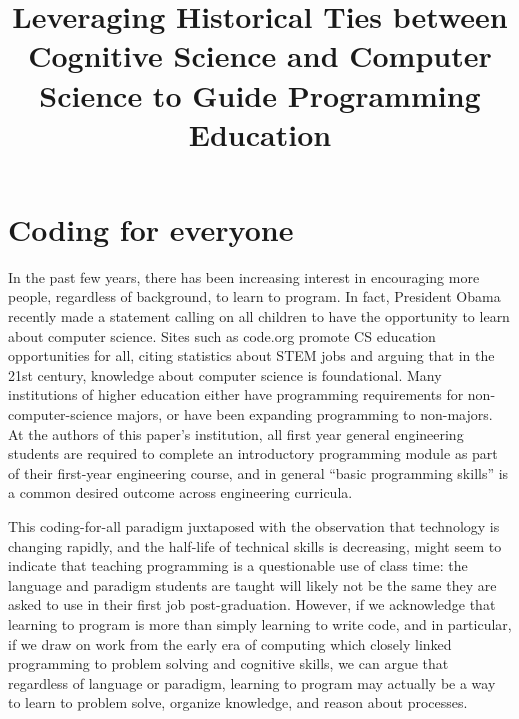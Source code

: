 \documentclass[12pt]{article}
\title{\large \textbf{Leveraging Historical Ties between Cognitive Science and
  Computer Science to Guide Programming Education}}
\author{}
\date{}
\begin{document}
\raggedright
\maketitle
\thispagestyle{empty}
\pagestyle{empty}

\section*{Coding for everyone}
In the past few years, there has been increasing interest in
encouraging more people, regardless of background, to learn to
program. In fact, President Obama recently made a statement calling on
all children to have the opportunity to learn about computer
science\autocite{whitehouse_computer_2016}. Sites such as code.org
promote CS education opportunities for all, citing statistics about
STEM jobs and arguing that in the 21st century, knowledge about
computer science is foundational\autocite{code.org_every_2016}. Many
institutions of higher education either have programming requirements
for non-computer-science majors, or have been expanding programming to
non-majors\autocite{rich_cs1_2004,forte_motivation_2005,guzdial_design_2005}. At
the authors of this paper's institution, all first year general
engineering students are required to complete an introductory
programming module as part of their first-year engineering course, and
in general ``basic programming skills'' is a common desired outcome
across engineering curricula\autocite{reid_classification_2014}.

This coding-for-all paradigm juxtaposed with the observation that
technology is changing rapidly, and the half-life of technical skills
is decreasing\autocite{nae_educating_2004}, might seem to indicate that
teaching programming is a questionable use of class time: the language
and paradigm students are taught will likely not be the same they are
asked to use in their first job post-graduation. However, if we
acknowledge that learning to program is more than simply learning to
write code, and in particular, if we draw on work from the early era of
computing which closely linked programming to problem solving and
cognitive skills, we can argue that regardless of language or
paradigm, learning to program may actually be a way to learn to
problem solve, organize knowledge, and reason about processes.
\end{document}
